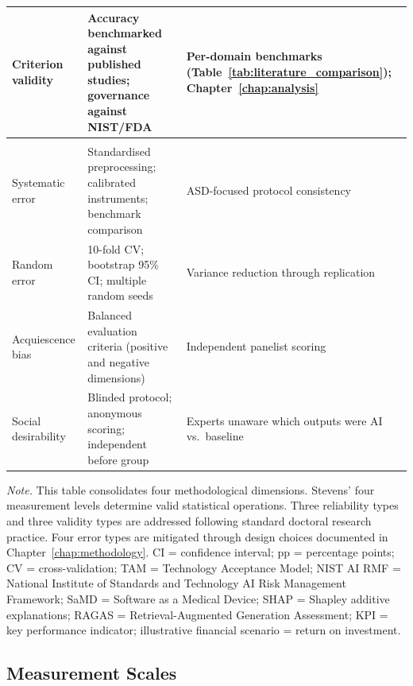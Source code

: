 {\begin{xltabular}{\textwidth}{@{} >{\raggedright\arraybackslash}p{2.2cm} L L @{}}
Criterion validity & Accuracy benchmarked against published studies; governance against NIST/FDA & Per-domain benchmarks (Table~\ref{tab:literature_comparison}); Chapter~\ref{chap:analysis} \\
\midrule
{} \\
\addlinespace
Systematic error & Standardised preprocessing; calibrated instruments; benchmark comparison & ASD-focused protocol consistency \\
Random error & 10-fold CV; bootstrap 95\% CI; multiple random seeds & Variance reduction through replication \\
Acquiescence bias & Balanced evaluation criteria (positive and negative dimensions) & Independent panelist scoring \\
Social desirability & Blinded protocol; anonymous scoring; independent before group & Experts unaware which outputs were AI vs.\ baseline \\
\end{xltabular}}
\vspace{0.5em}
\noindent\textit{Note.} This table consolidates four methodological dimensions. Stevens' four measurement levels determine valid statistical operations. Three reliability types and three validity types are addressed following standard doctoral research practice. Four error types are mitigated through design choices documented in Chapter~\ref{chap:methodology}. CI = confidence interval; pp = percentage points; CV = cross-validation; TAM = Technology Acceptance Model; NIST AI RMF = National Institute of Standards and Technology AI Risk Management Framework; SaMD = Software as a Medical Device; SHAP = Shapley additive explanations; RAGAS = Retrieval-Augmented Generation Assessment; KPI = key performance indicator; illustrative financial scenario = return on investment.

\fi %

\label{sec:measurement_quality}
\label{tab:measurement_quality_summary}
\label{tab:measurement_scales}
\label{tab:reliability_assessment}
\label{tab:validity_assessment}
\label{tab:measurement_errors}

\iffalse %
\subsection{Measurement Scales}

